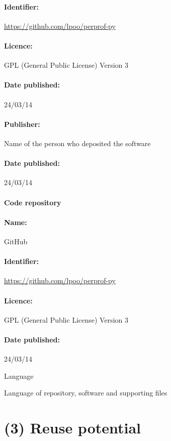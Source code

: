 \documentclass[10pt,a4paper]{article}
\begin{document}
\paragraph{Identifier:} \url{https://github.com/lpoo/perprof-py} 

\paragraph{Licence:} GPL (General Public License) Version 3

\paragraph{Date published:} 24/03/14

\paragraph{Publisher:} Name of the person who deposited the software

\paragraph{Date published:} 24/03/14

\paragraph{Code repository} 


\paragraph{Name:} GitHub

\paragraph{Identifier:} \url{https://github.com/lpoo/perprof-py} 

\paragraph{Licence:} GPL (General Public License) Version 3

\paragraph{Date published:} 24/03/14


Language

Language of repository, software and supporting files


\section*{(3) Reuse potential}

\printbibliography
\end{document}
